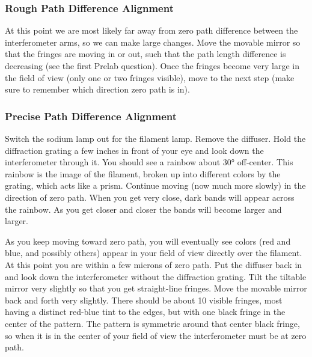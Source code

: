 \documentclass[]{manual}
\begin{document}
    \subsubsection{Rough Path Difference Alignment}

    At this point we are most likely far away from zero path difference between the interferometer arms, so we can make large changes.
    Move the movable mirror so that the fringes are moving in or out, such that the path length difference is decreasing (see the first Prelab question).
    Once the fringes become very large in the field of view (only one or two fringes visible), move to the next step (make sure to remember which direction zero path is in).

    \subsubsection{Precise Path Difference Alignment}

    Switch the sodium lamp out for the filament lamp.
    Remove the diffuser.
    Hold the diffraction grating a few inches in front of your eye and look down the interferometer through it.
    You should see a rainbow about $\ang{30}$ off-center.
    This rainbow is the image of the filament, broken up into different colors by the grating, which acts like a prism. Continue moving (now much more slowly) in the direction of zero path.
    When you get very close, dark bands will appear across the rainbow.
    As you get closer and closer the bands will become larger and larger.

    As you keep moving toward zero path, you will eventually see colors (red and blue, and possibly others) appear in your field of view directly over the filament.
    At this point you are within a few microns of zero path. Put the diffuser back in and look down the interferometer without the diffraction grating.
    Tilt the tiltable mirror very slightly so that you get straight-line fringes. Move the movable mirror back and forth very slightly.
    There should be about 10 visible fringes, most having a distinct red-blue tint to the edges, but with one black fringe in the center of the pattern.
    The pattern is symmetric around that center black fringe, so when it is in the center of your field of view the interferometer must be at zero path.

\end{document}
